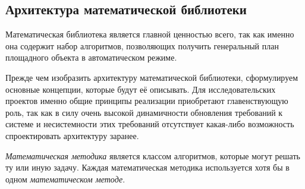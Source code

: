 \subsection*{\large{Архитектура математической библиотеки}}

Математическая библиотека является главной ценностью всего, так как именно она содержит
набор алгоритмов, позволяющих получить генеральный план площадного объекта в автоматическом режиме.

Прежде чем изобразить архитектуру математической библиотеки, сформулируем основные концепции,
которые будут её описывать.
Для исследовательских проектов именно общие принципы реализации
приобретают главенствующую роль, так как в силу очень высокой динамичности обновления требований к системе
и несистемности этих требований отсутствует какая-либо возможность спроектировать архитектуру заранее.

\textit{Математическая методика} является классом алгоритмов, которые могут решать ту или иную задачу.
Каждая математическая методика используется хотя бы в одном \textit{математическом методе}.

